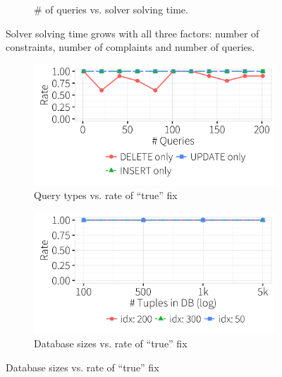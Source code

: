 \begin{figure}[t]
\begin{subfigure} [t]{.3\textwidth}
    \vspace*{-.25in}
    \caption{\# of queries vs. solver solving time.}
    \vspace*{-.1in}
    \label{f:heuristic_time} 
    \end{subfigure}
   \caption{Solver solving time grows with all three factors: number of constraints, number of complaints and number of queries. }
   \vspace*{-.1in}
   \label{f:soltime}
  \end{figure}

  \begin{figure}[ht]
  \centering
  \begin{subfigure} [t]{.3\textwidth}
    \includegraphics[width = .99\columnwidth]{figures/indelup_acc_idx}
    \vspace*{-.25in}
    \caption{Query types vs. rate of ``true'' fix}
    \vspace*{-.1in}
    \label{f:heuristic_time} 
    \end{subfigure}
    \begin{subfigure} [t]{.3\textwidth}
    \includegraphics[width = .99\columnwidth]{figures/dbsize_acc_idx}
    \vspace*{-.25in}
    \caption{Database sizes vs. rate of ``true'' fix}

\end{subfigure}
\end{figure}
